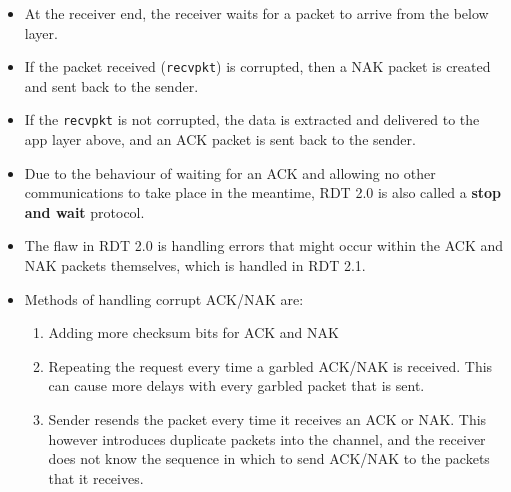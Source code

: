 \documentclass{article}
\theoremstyle{plain}
\theoremstyle{definition}
\begin{document}
\begin{itemize}
    \item At the receiver end, the receiver waits for a packet to arrive from the below layer. 
    
    \item If the packet received (\texttt{recvpkt}) is corrupted, then a NAK packet is created and sent back to the sender.
    
    \item If the \texttt{recvpkt} is not corrupted, the data is extracted and delivered to the app layer above, and an ACK packet is sent back to the sender. 
    
    \item Due to the behaviour of waiting for an ACK and allowing no other communications to take place in the meantime, RDT 2.0 is also called a \textbf{stop and wait} protocol. 
    
    \item The flaw in RDT 2.0 is handling errors that might occur within the ACK and NAK packets themselves, which is handled in RDT 2.1. 
    
    \item Methods of handling corrupt ACK/NAK are:
    \begin{enumerate}
        \item Adding more checksum bits for ACK and NAK
        
        \item Repeating the request every time a garbled ACK/NAK is received. This can cause more delays with every garbled packet that is sent. 
        
        \item Sender resends the packet every time it receives an ACK or NAK. This however introduces duplicate packets into the channel, and the receiver does not know the sequence in which to send ACK/NAK to the packets that it receives. 
    \end{enumerate}
\end{itemize}
\end{document}
